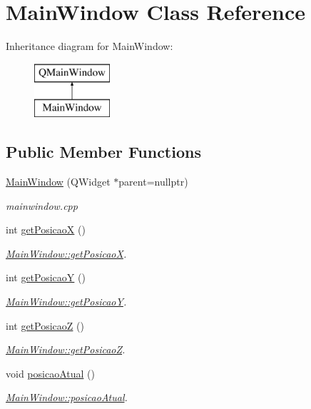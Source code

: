 \hypertarget{classMainWindow}{}\section{Main\+Window Class Reference}
\label{classMainWindow}
Inheritance diagram for Main\+Window\+:\begin{figure}[H]
\begin{center}
\leavevmode
\includegraphics[height=2.000000cm]{classMainWindow}
\end{center}
\end{figure}
\subsection*{Public Member Functions}
\begin{DoxyCompactItemize}
\item 
\mbox{\hyperlink{classMainWindow_a996c5a2b6f77944776856f08ec30858d}{Main\+Window}} (Q\+Widget $\ast$parent=nullptr)
\begin{DoxyCompactList}\small\item\em mainwindow.\+cpp \end{DoxyCompactList}\item 
int \mbox{\hyperlink{classMainWindow_a90c9a234855070a1629ee1b85cabb7d0}{get\+PosicaoX}} ()
\begin{DoxyCompactList}\small\item\em \mbox{\hyperlink{classMainWindow_a90c9a234855070a1629ee1b85cabb7d0}{Main\+Window\+::get\+PosicaoX}}. \end{DoxyCompactList}\item 
int \mbox{\hyperlink{classMainWindow_a79dd8ed86b37fd50a4f15293960adf16}{get\+PosicaoY}} ()
\begin{DoxyCompactList}\small\item\em \mbox{\hyperlink{classMainWindow_a79dd8ed86b37fd50a4f15293960adf16}{Main\+Window\+::get\+PosicaoY}}. \end{DoxyCompactList}\item 
int \mbox{\hyperlink{classMainWindow_a91cc6b0f1be1fae34eae724789370906}{get\+PosicaoZ}} ()
\begin{DoxyCompactList}\small\item\em \mbox{\hyperlink{classMainWindow_a91cc6b0f1be1fae34eae724789370906}{Main\+Window\+::get\+PosicaoZ}}. \end{DoxyCompactList}\item 
void \mbox{\hyperlink{classMainWindow_aaa69318d2e78939d276d2aff84b66fae}{posicao\+Atual}} ()
\begin{DoxyCompactList}\small\item\em \mbox{\hyperlink{classMainWindow_aaa69318d2e78939d276d2aff84b66fae}{Main\+Window\+::posicao\+Atual}}. \end{DoxyCompactList}\end{DoxyCompactItemize}


